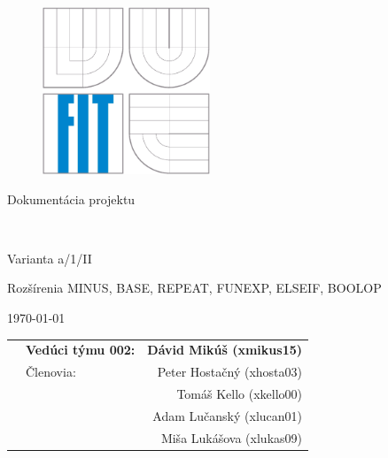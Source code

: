 \begin{titlepage}

\begin{figure}[!h]
  \centering
  \includegraphics[height=5cm]{img/logo.eps}
\end{figure}

\vfill

\begin{center}
\begin{Large}
Dokumentácia projektu\\
\end{Large}

\bigskip

	\begin{Huge}
		\projname\\
	\end{Huge}

	\begin{large}
		Varianta a/1/II\\
		{\small Rozšírenia MINUS, BASE, REPEAT, FUNEXP, ELSEIF, BOOLOP \par}
	\end{large}
\end{center}

\vfill

\begin{center}
\begin{Large}
\today
\end{Large}
\end{center}

\vfill

\begin{flushleft}

	\begin{large}
		\begin{tabularx}{\linewidth}{Xlr}
		   & \textbf{Vedúci týmu 002:} & \textbf{Dávid Mikúš (xmikus15)} \\
		   & Členovia: & Peter Hostačný (xhosta03) \\
		   &           & Tomáš Kello (xkello00) \\
		   &           & Adam Lučanský (xlucan01) \\
		   &           & Miša Lukášova (xlukas09)
		\end{tabularx}
	\end{large}
\end{flushleft}
\end{titlepage}
